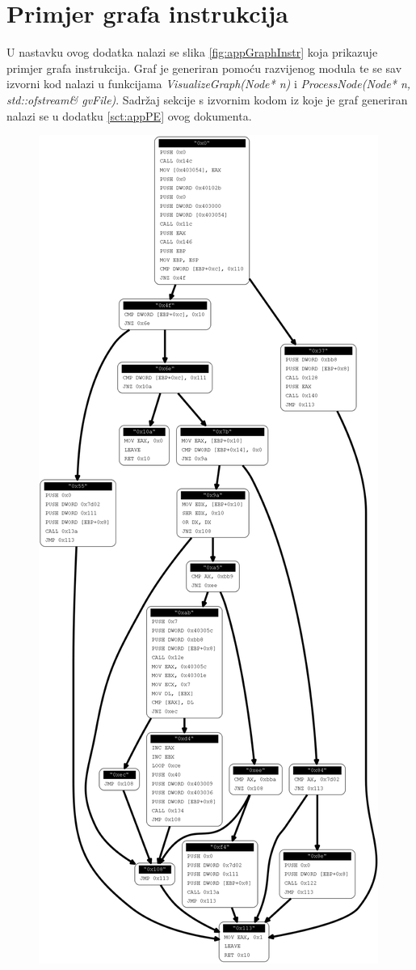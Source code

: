 \documentclass[times, utf8, diplomski, numeric]{fer}
\begin{document}
\chapter{Primjer grafa instrukcija}
\label{sct:appGraph}
U nastavku ovog dodatka nalazi se slika \ref{fig:appGraphInstr} koja prikazuje primjer grafa instrukcija. Graf je generiran pomoću razvijenog modula te se sav izvorni kod nalazi u funkcijama \emph{VisualizeGraph(Node* n)} i \emph{ProcessNode(Node* n, std::ofstream\& gvFile)}. Sadržaj sekcije s izvornim kodom iz koje je graf generiran nalazi se u dodatku \ref{sct:appPE} ovog dokumenta.
\begin{figure}[htb]
\centering
\setlength\fboxsep{0pt}
\setlength\fboxrule{0.5pt}
\includegraphics[width=\textwidth, height=\textheight]{slike/AD_CM1_graph}

\end{figure}
\end{document}
